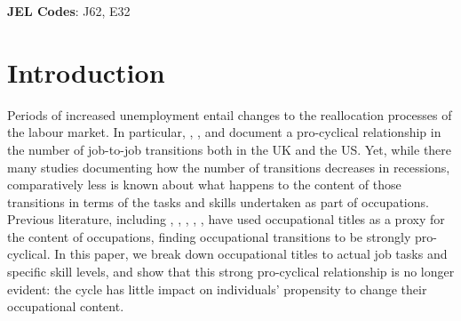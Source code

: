 \documentclass[11pt, oneside]{article}
\begin{document}
	\textbf{JEL Codes}: J62, E32
	
	\newpage
	\doublespacing
	\section{Introduction}
	\label{sec:Introduction}
	
	Periods of increased unemployment entail changes to the reallocation processes of the labour market. In particular,  \cite{Carrillo-Tudela2016},  \cite{MurphyTopel1987}, \cite{Moscarini2007} and \cite{Kambourov2008} document a pro-cyclical relationship in the number of job-to-job transitions both in the UK and the US. Yet, while there many studies documenting how the number of transitions decreases in recessions, comparatively less is known about what happens to the content of those transitions in terms of the tasks and skills undertaken as part of occupations. Previous literature, including \cite{MurphyTopel1987}, \cite{Moscarini2007}, \cite{Kambourov2008}, \cite{Carrillo-Tudela2014}, \cite{Carrillo-Tudela2016}, have used occupational titles as a proxy for the content of occupations, finding occupational transitions to be strongly pro-cyclical. 	
	In this paper, we break down occupational titles to actual job tasks and specific skill levels, and show that this strong pro-cyclical relationship is no longer evident: the cycle has little impact on individuals' propensity to change their occupational content. 
	
		\vspace{2mm}
	
\end{document}
